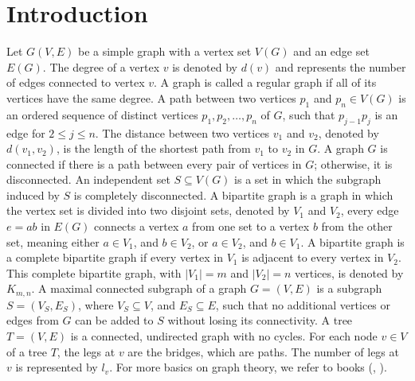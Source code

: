 \documentclass[]{interact}
\theoremstyle{plain}%
\theoremstyle{definition}
\theoremstyle{remark}
\begin{document}
	
	\section{Introduction}
	
	\noindent Let $G(V, E)$ be a simple graph with a vertex set $V(G)$ and an edge set $E(G)$. The degree of a vertex $v$ is denoted by $d(v)$ and represents the number of edges connected to vertex $v$. A graph is called a regular graph if all of its vertices have the same degree. A path between two vertices $p_1$ and $p_n \in V(G)$ is an ordered sequence of distinct vertices $p_1, p_2,\ldots,p_n$ of $G$, such that $p_{j-1}p_j$ is an edge for $2\leq j\leq n$. The distance between two vertices $v_1$ and $v_2$, denoted by $d(v_1, v_2)$, is the length of the shortest path from $v_1$ to $v_2$ in $G$. A graph $G$ is connected if there is a path between every pair of vertices in $G$; otherwise, it is disconnected. An independent set $S \subseteq V(G)$ is a set in which the subgraph induced by $S$ is completely disconnected. A bipartite graph is a graph in which the vertex set is divided into two disjoint sets, denoted by \( V_1 \) and \( V_2 \), every edge \( e = ab \) in \( E(G) \) connects a vertex \( a \) from one set to a vertex \( b \) from the other set, meaning either \( a \in V_1 \), and \( b \in V_2 \), or \( a \in V_2 \), and \( b \in V_1 \). A bipartite graph is a complete bipartite graph if every vertex in \( V_1 \) is adjacent to every vertex in \( V_2 \). This complete bipartite graph, with \(|V_1| = m\) and \(|V_2| = n\) vertices, is denoted by \( K_{m,n} \). A maximal connected subgraph of a graph \( G = (V, E) \) is a subgraph \( S = (V_S, E_S) \), where \( V_S \subseteq V \), and \( E_S \subseteq E \), such that no additional vertices or edges from \( G \) can be added to \( S \) without losing its connectivity. A tree \( T = (V, E) \) is a connected, undirected graph with no cycles. For each node \( v \in V \) of a tree \( T \), the legs at \( v \) are the bridges, which are paths. The number of legs at $ v$ is represented by $l_v$. For more basics on graph theory, we refer to books (\cite{w}, \cite{bo}).\\
\end{document}
